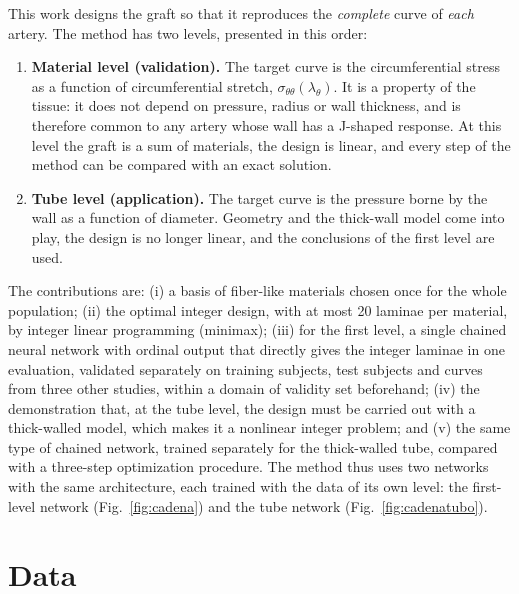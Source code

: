 This work designs the graft so that it reproduces the \emph{complete} curve of \emph{each} artery. The method has two levels, presented in this order:
\begin{enumerate}
\item \textbf{Material level (validation).} The target curve is the circumferential stress as a function of circumferential stretch, $\sigma_{\theta\theta}(\lambda_\theta)$. It is a property of the tissue: it does not depend on pressure, radius or wall thickness, and is therefore common to any artery whose wall has a J-shaped response. At this level the graft is a sum of materials, the design is linear, and every step of the method can be compared with an exact solution.
\item \textbf{Tube level (application).} The target curve is the pressure borne by the wall as a function of diameter. Geometry and the thick-wall model come into play, the design is no longer linear, and the conclusions of the first level are used.
\end{enumerate}
The contributions are: (i) a basis of fiber-like materials chosen once for the whole population; (ii) the optimal integer design, with at most 20 laminae per material, by integer linear programming (minimax); (iii) for the first level, a single chained neural network with ordinal output that directly gives the integer laminae in one evaluation, validated separately on training subjects, test subjects and curves from three other studies, within a domain of validity set beforehand; (iv) the demonstration that, at the tube level, the design must be carried out with a thick-walled model, which makes it a nonlinear integer problem; and (v) the same type of chained network, trained separately for the thick-walled tube, compared with a three-step optimization procedure. The method thus uses two networks with the same architecture, each trained with the data of its own level: the first-level network (Fig.~\ref{fig:cadena}) and the tube network (Fig.~\ref{fig:cadenatubo}).

\section{Data}\label{sec:datos}
